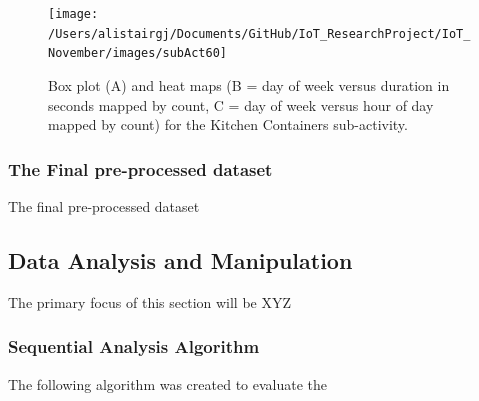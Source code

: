\documentclass[11pt,]{article}
\begin{document}
\begin{figure}[H]

{\centering \texttt{[image: /Users/alistairgj/Documents/GitHub/IoT\_ResearchProject/IoT\_November/images/subAct60]} 

}

\caption{Box plot (A) and heat maps (B = day of week versus duration in seconds mapped by count, C = day of week versus hour of day mapped by count) for the Kitchen Containers sub-activity.}\label{fig:subAct60}
\end{figure}

\hypertarget{the-final-pre-processed-dataset}{%
\subsubsection{The Final pre-processed
dataset}\label{the-final-pre-processed-dataset}}

The final pre-processed dataset

\hypertarget{data-analysis-and-manipulation}{%
\subsection{Data Analysis and
Manipulation}\label{data-analysis-and-manipulation}}

The primary focus of this section will be XYZ

\hypertarget{sequential-analysis-algorithm}{%
\subsubsection{Sequential Analysis
Algorithm}\label{sequential-analysis-algorithm}}

The following algorithm was created to evaluate the
\end{document}
